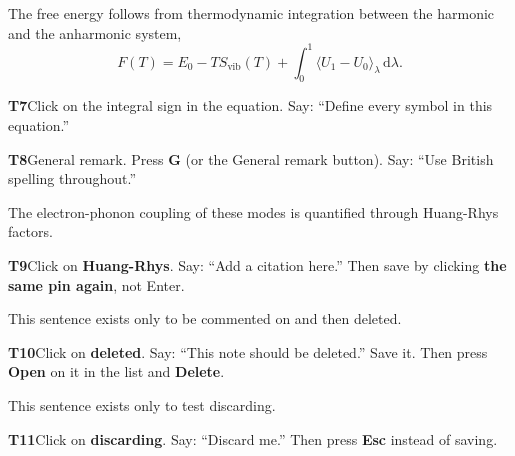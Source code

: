 \documentclass[11pt,a4paper]{article}
\newcommand{\instr}[2]{\par\smallskip\noindent\colorbox{instr!10}{\parbox{\dimexpr\linewidth-2\fboxsep}{\small\color{instr}\textbf{#1}\quad #2}}\par\smallskip}
\begin{document}
The free energy follows from thermodynamic integration between the harmonic and the anharmonic system,
\begin{equation}
	F(T) = E_0 - T S_\text{vib}(T) + \int_0^1 \langle U_1 - U_0 \rangle_\lambda \, \mathrm{d}\lambda . %
\end{equation}
\instr{T7}{Click on the integral sign in the equation. Say: ``Define every symbol in this equation.''}

\instr{T8}{General remark. Press \textbf{G} (or the General remark button). Say: ``Use British spelling throughout.''} %

The electron-phonon coupling of these modes is quantified through Huang-Rhys factors. %
\instr{T9}{Click on \textbf{Huang-Rhys}. Say: ``Add a citation here.'' Then save by clicking \textbf{the same pin again}, not Enter.}

This sentence exists only to be commented on and then deleted. %
\instr{T10}{Click on \textbf{deleted}. Say: ``This note should be deleted.'' Save it. Then press \textbf{Open} on it in the list and \textbf{Delete}.}

This sentence exists only to test discarding. %
\instr{T11}{Click on \textbf{discarding}. Say: ``Discard me.'' Then press \textbf{Esc} instead of saving.}
\end{document}
